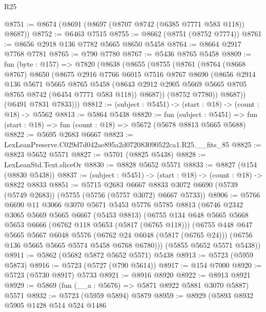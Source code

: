 \begin{lexlean}{R25}
\begin{coremodule}
@8751 := @8674 (@8691 (@8697 (@8707 @8742 (@6385 @7771 @583 @118)) @8687))
@8752 := @6463 @7515
@8755 := @8662 (@8751 (@8752 @7774))
@8761 := @8656 @2918 @136 @7782 @5665 @8650 @5458
@8764 := @8664 @2917 @7768 @7781
@8765 := @790 @7780
@8767 := @5436 @8765 @5458
@8809 := fun (byte : @157) =>
  @7820
    (@8638
      (@8655
        (@8755
          (@8761
            (@8764
              (@8668 @8767)
              @8650
              (@8675
                @2916
                @7766
                @6015
                @7516
                @8767
                @8690
                (@8656
                  @2914
                  @136
                  @5671
                  @5665
                  @8765
                  @5458
                  (@8643 @2912 @2905 @5669 @5665 @8705 @8765 @8742 (@6454 @7771 @583 @118))
                  @8687))
              (@8752 @7780))
            @8687))
        (@6491 @7831 @7833)))
@8812 := (subject : @5451) -> (start : @18) -> (count : @18) -> @5562
@8813 := @5864 @5438
@8820 := fun (subject : @5451) =>
  fun (start : @18) => fun (count : @18) => @5672 (@5678 @8813 @5665 @5688)
@8822 := @5695 @2683 @6667
@8823 := LexLeanPreserve.C029d7d042ae895a2d072083090522ca1.R25.__fits_85
@8825 := @8823 @5652 @5571
@8827 := @5701 (@8825 @5438)
@8828 := LexLeanStd.Text.sliceOr
@8830 := @8828 @5652 @5571
@8833 := @8827 (@154 (@8830 @5438))
@8837 := (subject : @5451) -> (start : @18) -> (count : @18) -> @8822 @8833
@8851 := @5715
    @2683
    @6667
    @8833
    @3072
    @6690
    (@5739 (@5749 @2683))
    (@5755 (@5756 (@5757 @3072) @6667 @5733))
@8906 := @5766
    @6690
    @11
    @3066
    @3070
    @5671
    @5453
    @5776
    @5785
    @8813
    (@6746
      @2342
      @3065
      @5669
      @5665
      @6667
      (@5453 @8813)
      (@6755
        @134
        @648
        @5665
        @5668
        @5653
        @6666
        (@6762 @118 @5653 (@5817 (@6765 @118)))
        (@6755
          @448
          @647
          @5665
          @5667
          @6048
          @5576
          (@6762 @24 @6048 (@5817 (@6765 @24)))
          (@6756 @136 @5665 @5665 @5574 @5458 @6768 @6780)))
      (@5855 @5652 @5571 @5438))
@8911 := @5862 (@5682 @5872 @5652 @5571) @5438
@8913 := @5723 (@5959 @5873)
@8916 := @5723 (@5727 (@790 @5614))
@8917 := @154 @7000
@8920 := @5723 (@5730 @8917) @5733
@8921 := @8916 @8920
@8922 := @8913 @8921
@8929 := @5869 (fun (__a : @5676) => @5871 @8922 @5881 @3070 @5887) @5571
@8932 := @5723 (@5959 @5894) @5879
@8959 := @8929
    (@5893
      @8932
      @5905
      @1428
      @514
      @524
      @1486

\end{coremodule}
\end{lexlean}
